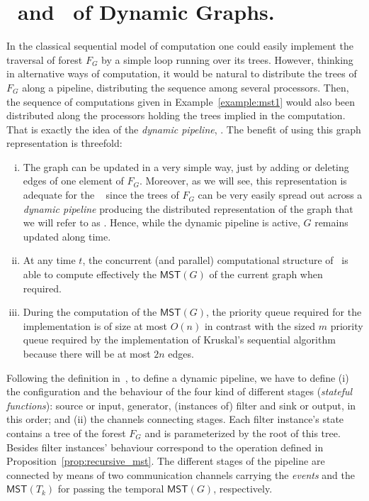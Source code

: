 \section{\dpm\ and \msts\ of Dynamic Graphs.} 
In the classical sequential model of computation one could easily implement the traversal of forest $F_G$ by a simple loop running over its trees. However, thinking in alternative ways of computation, it would be natural to distribute the trees of $F_G$ along a pipeline, distributing the sequence among several processors. Then, the sequence of computations given in Example~\ref{example:mst1} would also been distributed along the processors holding the trees implied in the computation. That is exactly the idea of the \emph{dynamic pipeline}, \DPmst. The benefit of using this graph representation is threefold: 
\begin{enumerate}[(i)]
    \item The graph can be updated in a very simple way, just by adding or deleting edges of one element of $F_G$. Moreover, as we will see, this representation is adequate for the \dpm~\cite{Pasarella2024} since the trees of $F_G$ can be very easily spread out across a {\em dynamic pipeline} producing the distributed representation of the graph that we will refer to as \DPmst. Hence, while the dynamic pipeline is active, $G$ remains updated along time.

    \item  At any  time $t$, the concurrent (and parallel) computational structure of \DPmst\ is able to compute effectively the $\mathsf{MST}(G)$ of the current graph when required.

    \item During the computation of the $\mathsf{MST}(G)$, the priority queue required for the implementation is of size at most $O(n)$ in contrast with the sized $m$ priority queue required by the implementation of Kruskal's sequential algorithm because there will be at most $2n$ edges.
\end{enumerate}

Following the definition in~\cite{Pasarella2024}, to define a dynamic pipeline, we have to define (i) the configuration and the behaviour of the four kind of  different stages (\emph{stateful functions}): source or input, generator,  (instances of) filter and sink or output, in this order; and (ii) the channels connecting stages. Each filter instance's state contains a tree of the forest $F_G$ and is parameterized by the root of this tree. Besides filter instances' behaviour  correspond to the operation defined in Proposition~\ref{prop:recursive_mst}. The different stages of the pipeline are connected by means of two communication channels carrying the {\em events} and the  $\mathsf{MST}(T_k)$ for passing the temporal $\mathsf{MST}(G)$, respectively.

